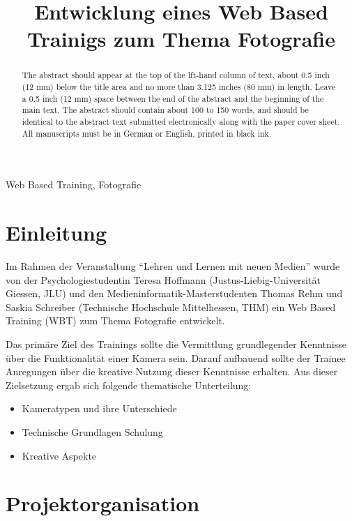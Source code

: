\documentclass{article}
\title{Entwicklung eines Web Based Trainigs zum Thema Fotografie}
\begin{document}
%
\maketitle
%
\begin{abstract}
The abstract should appear at the top of the lft-hand column of text, about
0.5 inch (12 mm) below the title area and no more than 3.125 inches (80 mm) in
length.  Leave a 0.5 inch (12 mm) space between the end of the abstract and the
beginning of the main text.  The abstract should contain about 100 to 150
words, and should be identical to the abstract text submitted electronically
along with the paper cover sheet. All manuscripts must be in German or English, printed in black ink.
\end{abstract}
%
\begin{keywords}
Web Based Training, Fotografie
\end{keywords}
%
\section{Einleitung}
\label{sec:intro}

Im Rahmen der Veranstaltung ``Lehren und Lernen mit neuen Medien'' wurde von der Psychologiestudentin Teresa Hoffmann (Justus-Liebig-Universit\"at Giessen, JLU) und den Medieninformatik-Masterstudenten Thomas Rehm und Saskia Schreiber (Technische Hochschule Mittelhessen, THM) ein Web Based Training (WBT) zum Thema Fotografie entwickelt.

Das prim\"are Ziel des Trainings sollte die Vermittlung grundlegender Kenntnisse \"uber die Funktionalit\"at einer Kamera sein. Darauf aufbauend sollte der Trainee Anregungen \"uber die kreative Nutzung dieser Kenntnisse erhalten.
Aus dieser Zielsetzung ergab sich folgende thematische Unterteilung:



\begin{itemize}
\item Kameratypen und ihre Unterschiede
\item Technische Grundlagen Schulung
\item Kreative Aspekte

\end{itemize}


\section{Projektorganisation}
\label{sec:orga}
\end{document}
